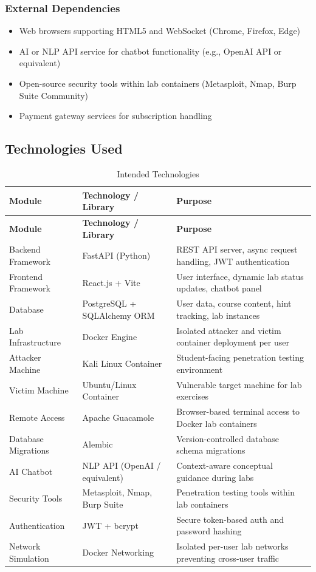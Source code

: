 \documentclass[12pt,a4paper]{report}
\newcommand{\hrow}{}
\newcommand{\hcell}[1]{\textbf{#1}}
\newcommand{\altrow}{}
\begin{document}
\subsubsection{External Dependencies}
\begin{itemize}
  \item Web browsers supporting HTML5 and WebSocket (Chrome, Firefox, Edge)
  \item AI or NLP API service for chatbot functionality (e.g., OpenAI API or equivalent)
  \item Open-source security tools within lab containers (Metasploit, Nmap, Burp Suite Community)
  \item Payment gateway services for subscription handling
\end{itemize}

\subsection{Technologies Used}

\begin{longtable}{|L{3cm}|L{3.8cm}|L{7.2cm}|}
\caption{Intended Technologies}\label{tab:technologies}\\
\hline
\hrow \hcell{Module} & \hcell{Technology / Library} & \hcell{Purpose} \\
\hline
\endfirsthead
\hline
\hrow \hcell{Module} & \hcell{Technology / Library} & \hcell{Purpose} \\
\hline
\endhead
Backend Framework & FastAPI (Python) & REST API server, async request handling, JWT authentication \\\hline
\altrow Frontend Framework & React.js + Vite & User interface, dynamic lab status updates, chatbot panel \\\hline
Database & PostgreSQL + SQLAlchemy ORM & User data, course content, hint tracking, lab instances \\\hline
\altrow Lab Infrastructure & Docker Engine & Isolated attacker and victim container deployment per user \\\hline
Attacker Machine & Kali Linux Container & Student-facing penetration testing environment \\\hline
\altrow Victim Machine & Ubuntu/Linux Container & Vulnerable target machine for lab exercises \\\hline
Remote Access & Apache Guacamole & Browser-based terminal access to Docker lab containers \\\hline
\altrow Database Migrations & Alembic & Version-controlled database schema migrations \\\hline
AI Chatbot & NLP API (OpenAI / equivalent) & Context-aware conceptual guidance during labs \\\hline
\altrow Security Tools & Metasploit, Nmap, Burp Suite & Penetration testing tools within lab containers \\\hline
Authentication & JWT + bcrypt & Secure token-based auth and password hashing \\\hline
\altrow Network Simulation & Docker Networking & Isolated per-user lab networks preventing cross-user traffic \\\hline
\end{longtable}
\end{document}
